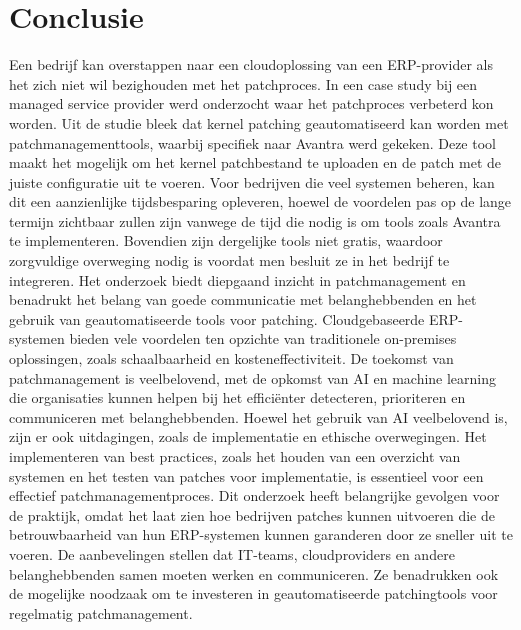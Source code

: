 
\chapter{Conclusie}%
\label{ch:conclusie}


Een bedrijf kan overstappen naar een cloudoplossing van een ERP-provider als het zich niet wil bezighouden met het patchproces.
In een case study bij een managed service provider werd onderzocht waar het patchproces verbeterd kon worden. Uit de studie bleek dat kernel patching geautomatiseerd kan worden met patchmanagementtools, waarbij specifiek naar Avantra werd gekeken. Deze tool maakt het mogelijk om het kernel patchbestand te uploaden en de patch met de juiste configuratie uit te voeren. Voor bedrijven die veel systemen beheren, kan dit een aanzienlijke tijdsbesparing opleveren, hoewel de voordelen pas op de lange termijn zichtbaar zullen zijn vanwege de tijd die nodig is om tools zoals Avantra te implementeren. Bovendien zijn dergelijke tools niet gratis, waardoor zorgvuldige overweging nodig is voordat men besluit ze in het bedrijf te integreren.
Het onderzoek biedt diepgaand inzicht in patchmanagement en benadrukt het belang van goede communicatie met belanghebbenden en het gebruik van geautomatiseerde tools voor patching. Cloudgebaseerde ERP-systemen bieden vele voordelen ten opzichte van traditionele on-premises oplossingen, zoals schaalbaarheid en kosteneffectiviteit. De toekomst van patchmanagement is veelbelovend, met de opkomst van AI en machine learning die organisaties kunnen helpen bij het efficiënter detecteren, prioriteren en communiceren met belanghebbenden. Hoewel het gebruik van AI veelbelovend is, zijn er ook uitdagingen, zoals de implementatie en ethische overwegingen.
Het implementeren van best practices, zoals het houden van een overzicht van systemen en het testen van patches voor implementatie, is essentieel voor een effectief patchmanagementproces. Dit onderzoek heeft belangrijke gevolgen voor de praktijk, omdat het laat zien hoe bedrijven patches kunnen uitvoeren die de betrouwbaarheid van hun ERP-systemen kunnen garanderen door ze sneller uit te voeren. De aanbevelingen stellen dat IT-teams, cloudproviders en andere belanghebbenden samen moeten werken en communiceren. Ze benadrukken ook de mogelijke noodzaak om te investeren in geautomatiseerde patchingtools voor regelmatig patchmanagement.


